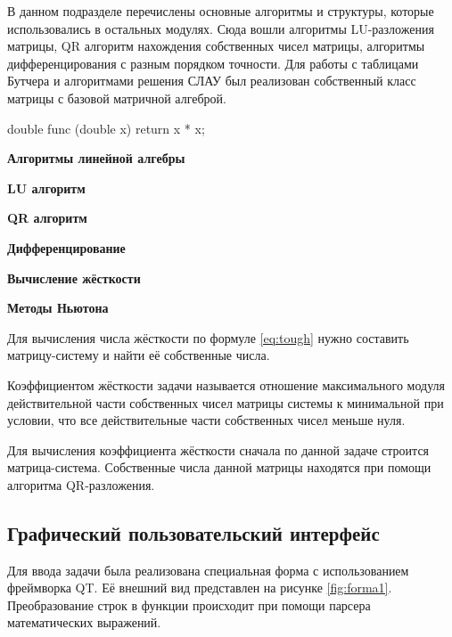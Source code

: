 В данном подразделе перечислены основные алгоритмы и структуры, которые использовались в остальных модулях. Сюда вошли алгоритмы
LU-разложения матрицы, QR алгоритм нахождения собственных чисел матрицы, алгоритмы дифференцирования с разным порядком точности. Для
работы с таблицами Бутчера и алгоритмами решения СЛАУ был реализован собственный класс матрицы с базовой матричной алгеброй.

double func (double x) {
    return x * x;
}

\textbf{Алгоритмы линейной алгебры}

\textbf{LU алгоритм}

\textbf{QR алгоритм}

\textbf{Дифференцирование}

\textbf{Вычисление жёсткости}

\textbf{Методы Ньютона}

Для вычисления числа жёсткости по формуле \ref{eq:tough} нужно составить матрицу-систему и найти её собственные числа.

Коэффициентом жёсткости задачи называется отношение максимального модуля действительной части собственных чисел матрицы системы к
минимальной при условии, что все действительные части собственных чисел меньше нуля.

Для вычисления коэффициента жёсткости сначала по данной задаче строится матрица-система. Собственные числа данной матрицы находятся
при помощи алгоритма QR-разложения.







\subsection{Графический пользовательский интерфейс}

Для ввода задачи была реализована специальная форма с использованием фреймворка QT. Её внешний вид представлен на рисунке \ref{fig:forma1}.
Преобразование строк в функции происходит при помощи парсера математических выражений.

